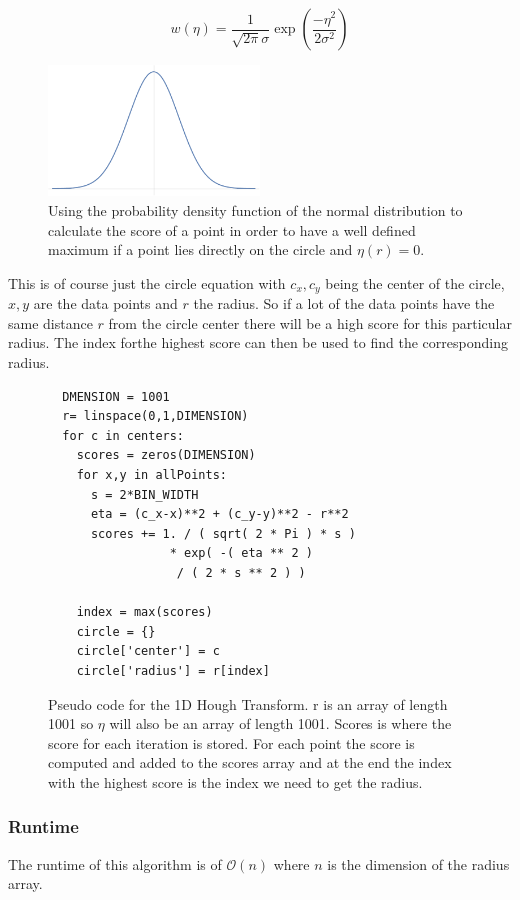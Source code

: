 \documentclass[11pt,twoside]{scrreprt}
\begin{document}
\begin{equation}
\label{eq:weight_function}
  w(\eta) = \frac{1}{\sqrt{2\pi}\sigma}\exp\left( \frac{-\eta^2}{2\sigma^2}\right)
\end{equation}
\begin{figure}[tb]
  \centering
  \includegraphics[width=0.5\textwidth]{pics/gauss}
  \caption{Using the probability density function of the normal distribution to calculate the score of a point in order to have a well defined maximum if a point
  lies directly on the circle and $\eta(r) = 0$. }
  \label{fig:gauss}
\end{figure}
This is of course just the circle equation with $c_x, c_y$ being the center of the circle, $x, y$ are the data points and $r$ the radius.
So if a lot of the data points have the same distance $r$ from the circle center there will be a high score for this particular radius. The index
forthe highest score can then be used to find the corresponding radius.

\begin{figure}
  \begin{lstlisting}
  DMENSION = 1001
  r= linspace(0,1,DIMENSION)
  for c in centers:
    scores = zeros(DIMENSION)
    for x,y in allPoints:
      s = 2*BIN_WIDTH
      eta = (c_x-x)**2 + (c_y-y)**2 - r**2
      scores += 1. / ( sqrt( 2 * Pi ) * s ) 
                 * exp( -( eta ** 2 ) 
                  / ( 2 * s ** 2 ) )
  
    index = max(scores)
    circle = {}
    circle['center'] = c
    circle['radius'] = r[index]
\end{lstlisting}
\caption{Pseudo code for the 1D Hough Transform. r is an array of length 1001 so $\eta$ will also be an array of length 1001. Scores is where the score for each iteration is stored. For each point the score is computed and added to the scores array and at the end the index with the highest score is the index we need to get the radius.}
\end{figure}

\subsubsection{Runtime} %
The runtime of this algorithm is of $\mathcal{O}(n)$ where $n$ is the dimension of the radius array.
\label{ssub:runtime_1d}
\end{document}
